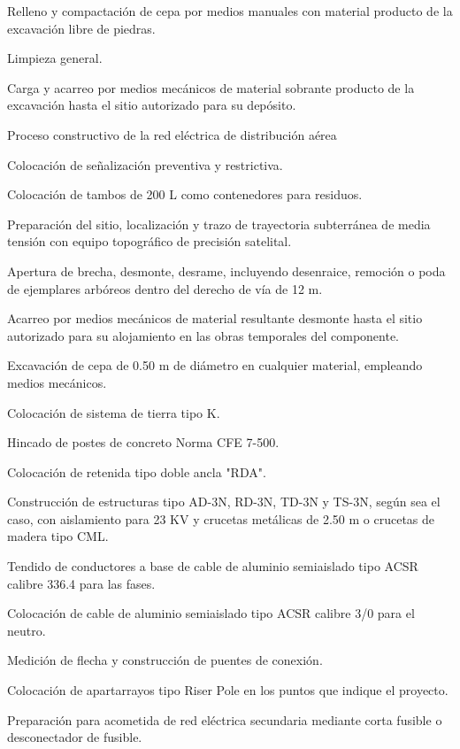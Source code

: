 \documentclass{article}
\begin{document}
Relleno y compactación de cepa por medios manuales con material producto de la excavación libre de piedras.

Limpieza general.

Carga y acarreo por medios mecánicos de material sobrante producto de la excavación hasta el sitio autorizado para su depósito.


\bigskip


\bigskip

Proceso constructivo de la red eléctrica de distribución aérea


\bigskip

Colocación de señalización preventiva y restrictiva.

Colocación de tambos de 200 L como contenedores para residuos.

Preparación del sitio, localización y trazo de trayectoria subterránea de media tensión con equipo topográfico de precisión satelital.

Apertura de brecha, desmonte, desrame, incluyendo desenraice, remoción o poda de ejemplares arbóreos dentro del derecho de vía de 12 m.

Acarreo por medios mecánicos de material resultante desmonte hasta el sitio autorizado para su alojamiento en las obras temporales del componente.

Excavación de cepa de 0.50 m de diámetro en cualquier material, empleando medios mecánicos.

Colocación de sistema de tierra tipo K.

Hincado de postes de concreto Norma CFE 7-500.

Colocación de retenida tipo doble ancla "RDA".

Construcción de estructuras tipo AD-3N, RD-3N, TD-3N y TS-3N, según sea el caso, con aislamiento para 23 KV y crucetas metálicas de 2.50 m o crucetas de madera tipo CML.

Tendido de conductores a base de cable de aluminio semiaislado tipo ACSR calibre 336.4 para las fases.

Colocación de cable de aluminio semiaislado tipo ACSR calibre 3/0 para el neutro.

Medición de flecha y construcción de puentes de conexión.

Colocación de apartarrayos tipo Riser Pole en los puntos que indique el proyecto.

Preparación para acometida de red eléctrica secundaria mediante corta fusible o desconectador de fusible.
\end{document}
